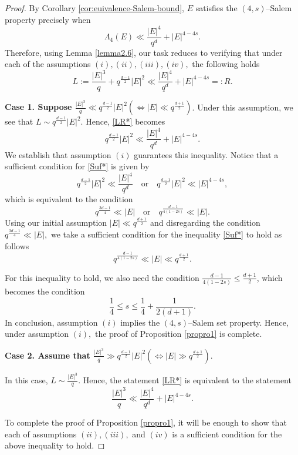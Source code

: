 \documentclass[10pt,a4paper]{amsart}
\begin{document}
\begin{proof}

By Corollary \ref{cor:euivalence-Salem-bound}, $E$ satisfies the $(4, s)$--Salem property precisely when
\[ \Lambda_4(E) \ll \frac{|E|^4}{q^d}+ |E|^{4-4s} .\]
Therefore, using Lemma  \eqref{lemma2.6}, our task reduces to verifying that under each of the assumptions $(i), (ii), (iii), (iv),$ the following holds
\begin{equation} \label{LR*} L:= \frac{|E|^3}{q} + q^{\frac{d-1}{2}}|E|^2 \ll \frac{|E|^4}{q^d}+ |E|^{4-4s}=: R. \end{equation}

\medskip
\noindent
\textbf{Case 1. Suppose $\frac{|E|^3}{q} \ll q^{\frac{d-1}{2}}|E|^2 (\iff |E| \ll q^{\frac{d+1}{2}})$}.
Under this assumption,  we see that $L\sim q^{\frac{d-1}{2}}|E|^2$. Hence,  \eqref{LR*} becomes
\begin{equation}\label{Suf*} q^{\frac{d-1}{2}}|E|^2 \ll \frac{|E|^4}{q^d}+ |E|^{4-4s}.\end{equation}
We establish that assumption $(i)$ guarantees this inequality.
Notice that  a sufficient condition for  \eqref{Suf*} is given by 
\[ q^{\frac{d-1}{2}}|E|^2 \ll \frac{|E|^4}{q^d}  \quad \mbox{or} \quad  q^{\frac{d-1}{2}}|E|^2 \ll  |E|^{4-4s},\]
which is  equivalent to the condition
$$  q^{\frac{3d-1}{4}} \ll |E|  \quad \mbox{or}\quad q^{\frac{d-1}{4(1-2s)} }\ll |E|.$$
Using  our initial assumption $|E|\ll q^{\frac{d+1}{2}}$ and disregarding the condition $q^{\frac{3d-1}{4}} \ll |E|, $  we take a sufficient condition for the inequality \eqref{Suf*} to hold as follows
\[q^{\frac{d-1}{4(1-2s)} }\ll |E| \ll q^{\frac{d+1}{2}}.\]

For this inequality to hold,  we  also need the condition 
$\frac{d-1}{4(1-2s)} \le \frac{d+1}{2}$, which becomes the condition 
$$\frac{1}{4} \leq s \le \frac{1}{4}+\frac{1}{2(d+1)}.$$
In conclusion,   assumption $(i)$ implies  the $(4,s)$--Salem set property.  Hence, under assumption $(i),$ the proof of Proposition \ref{propro1} is complete.

\textbf{Case 2. Assume that $\frac{|E|^3}{q} \gg q^{\frac{d-1}{2}}|E|^2 (\iff |E| \gg q^{\frac{d+1}{2}})$}.

In this case,   $L\sim \frac{|E|^3}{q}$.   Hence,  the statement \eqref{LR*}  is equivalent to the statement
\begin{equation}\label{ECT*} \frac{|E|^3}{q}  \ll  \frac{|E|^4}{q^d}+ |E|^{4-4s}.\end{equation}

To complete the proof of Proposition \ref{propro1},  it will be enough to show that   each of assumptions $(ii), (iii),$ and $(iv)$ is a sufficient condition for the above inequality to hold.


\end{proof}
\end{document}
